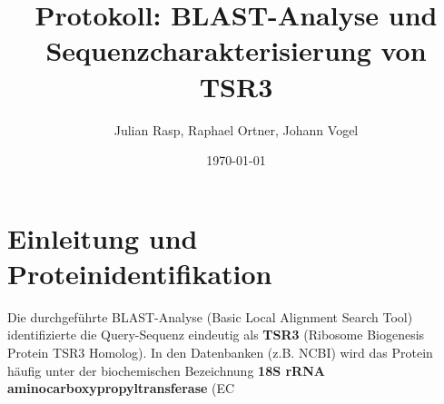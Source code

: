 \documentclass[a4paper,11pt,draft]{article}
\title{Protokoll: BLAST-Analyse und Sequenzcharakterisierung von TSR3}
\author{Julian Rasp, Raphael Ortner, Johann Vogel}
\date{\today}
\begin{document}
\maketitle

\section{Einleitung und Proteinidentifikation}
Die durchgeführte BLAST-Analyse (Basic Local Alignment Search Tool) identifizierte die Query-Sequenz eindeutig als \textbf{TSR3} (Ribosome Biogenesis Protein TSR3 Homolog). In den Datenbanken (z.B. NCBI) wird das Protein häufig unter der biochemischen Bezeichnung \textbf{18S rRNA aminocarboxypropyltransferase} (EC
\end{document}
